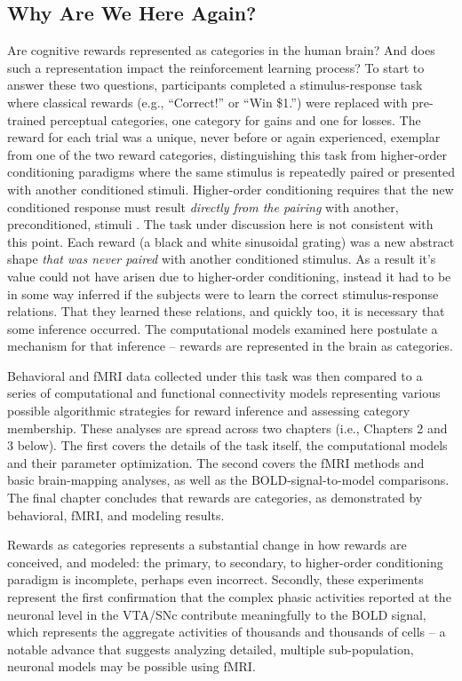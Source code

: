 \subsection{Why Are We Here Again?}
\label{sub:goals}
Are cognitive rewards represented as categories in the human brain?  And does such a representation impact the reinforcement learning process?  To start to answer these two questions, participants completed a stimulus-response task where classical rewards (e.g., ``Correct!'' or ``Win \$1.'') were replaced with pre-trained perceptual categories, one category for gains and one for losses.  The reward for each trial was a unique, never before or again experienced, exemplar from one of the two reward categories, distinguishing this task from higher-order conditioning paradigms where the same stimulus is repeatedly paired or presented with another conditioned stimuli.  Higher-order conditioning requires that the new conditioned response must result \emph{directly from the pairing} with another, preconditioned, stimuli \citep{Gewirtz:2000p9847,Rizley:1972p9858}.  The task under discussion here is not consistent with this point.  Each reward (a black and white sinusoidal grating) was a new abstract shape \emph{that was never paired} with another conditioned stimulus.   As a result it's value could not have arisen due to higher-order conditioning, instead it had to be in some way inferred if the subjects were to learn the correct stimulus-response relations.  That they learned these relations, and quickly too, it is necessary that some inference occurred.  The computational models examined here postulate a mechanism for that inference -- rewards are represented in the brain as categories.

Behavioral and fMRI data collected under this task was then compared to a series of computational and functional connectivity models representing various possible algorithmic strategies for reward inference and assessing category membership.  These analyses are spread across two chapters (i.e., Chapters 2 and 3 below).  The first covers the details of the task itself, the computational models and their parameter optimization.  The second covers the fMRI methods and basic brain-mapping analyses, as well as the BOLD-signal-to-model comparisons.  The final chapter concludes that rewards are categories, as demonstrated by behavioral, fMRI, and modeling results.  

Rewards as categories represents a substantial change in how rewards are conceived, and modeled: the primary, to secondary, to higher-order conditioning paradigm is incomplete, perhaps even incorrect.   Secondly, these experiments represent the first confirmation that the complex phasic activities reported at the neuronal level in the VTA/SNc \citep{Kim:2006p1063, Matsumoto:2009p7219,Smith:2011p9101} contribute meaningfully to the BOLD signal, which represents the aggregate activities of thousands and thousands of cells -- a notable advance that suggests analyzing detailed, multiple sub-population, neuronal models may be possible using fMRI.
\clearpage